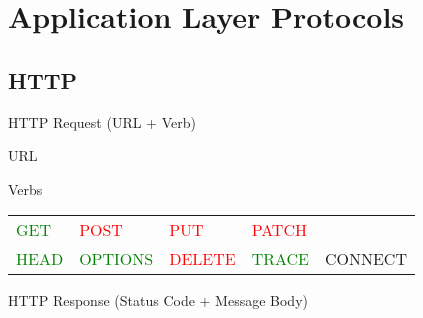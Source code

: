 \mode*
{}

\section{Application Layer Protocols}

\subsection{HTTP}

\begin{frame}
  \centering
\end{frame}

\begin{frame}{HTTP Request (URL + Verb)}
  \begin{iblock}{URL}
    \centering
    \mode<beamer>{ \texttt{[image: Url]} }%
  \end{iblock}
  \begin{center}
  \end{center}
  \begin{iblock}{Verbs}
    \begin{tabular}{lllll}
      \textcolor{Green}{GET}&\textcolor{Red}{POST}&
      \textcolor{Red}{PUT}&\textcolor{Red}{PATCH}&\\
      \textcolor{Green}{HEAD}&\textcolor{Green}{OPTIONS}&
      \textcolor{Red}{DELETE}&\textcolor{Green}{TRACE}&CONNECT
    \end{tabular}
  \end{iblock}
\end{frame}

\begin{frame}{HTTP Response (Status Code + Message Body)}
  \centering
  \mode<beamer>{ \texttt{[image: http-Res]} }%
\end{frame}

